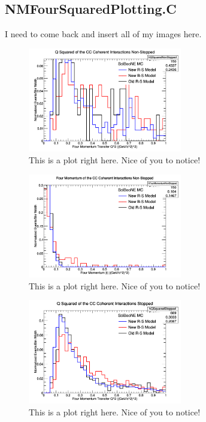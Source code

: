 \documentclass[11pt]{article}
\begin{document}
\subsection{NMFourSquaredPlotting.C}
I need to come back and insert all of my images here.

\begin{figure}[H]
\centering
\includegraphics[width=0.6\textwidth]{NMFourSquaredPlottingImages/1-NMFourSquaredPlotting.png}
\caption{This is a plot right here. Nice of you to notice!}
\end{figure}

\begin{figure}[H]
\centering
\includegraphics[width=0.6\textwidth]{NMFourSquaredPlottingImages/2-NMFourSquaredPlotting.png}
\caption{This is a plot right here. Nice of you to notice!}
\end{figure}

\begin{figure}[H]
\centering
\includegraphics[width=0.6\textwidth]{NMFourSquaredPlottingImages/3-NMFourSquaredPlotting.png}
\caption{This is a plot right here. Nice of you to notice!}
\end{figure}
\end{document}
